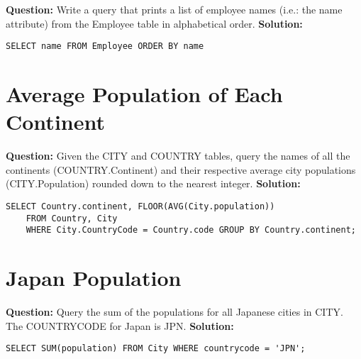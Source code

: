 \documentclass[draft,10pt,a4paper,titlepage]{report}
\begin{document}
{\textbf{Question:} Write a query that prints a list of employee names (i.e.: the name attribute) from the Employee table in alphabetical order.\newline\newline
\textbf{Solution:}\newline
\begin{verbatim}
SELECT name FROM Employee ORDER BY name
\end{verbatim}

\section{Average Population of Each Continent}

\textbf{Question:} Given the CITY and COUNTRY tables, query the names of all the continents (COUNTRY.Continent) and their respective average city populations (CITY.Population) rounded down to the nearest integer.\newline\newline
\textbf{Solution:}\newline
\begin{verbatim}
SELECT Country.continent, FLOOR(AVG(City.population)) 
	FROM Country, City 
	WHERE City.CountryCode = Country.code GROUP BY Country.continent;
\end{verbatim}

\section{Japan Population}

\textbf{Question:} Query the sum of the populations for all Japanese cities in CITY. The COUNTRYCODE for Japan is JPN.\newline\newline
\textbf{Solution:}\newline
\begin{verbatim}
SELECT SUM(population) FROM City WHERE countrycode = 'JPN';

\end{verbatim}

}
\end{document}
